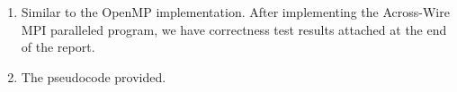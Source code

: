 \documentclass[letterpaper,11pt]{exam}
\begin{document}
\begin{questions}



    \begin{enumerate}[label=\roman*.]
        \item Similar to the OpenMP implementation. After implementing the Across-Wire MPI paralleled program, we have correctness test results attached at the end of the report.
        \item The pseudocode provided.


\end{enumerate}
\end{questions}
\end{document}
